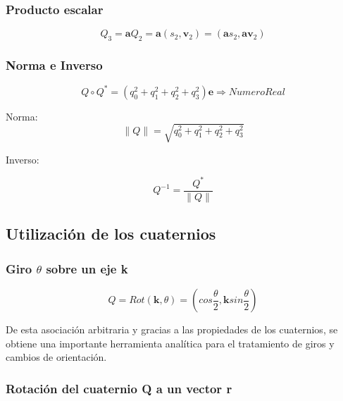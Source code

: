 \documentclass[letterpaper, openright, 12pt, spanish]{report}
\begin{document}
\subsubsection{Producto escalar}

\begin{displaymath}
Q_3=\textbf{a}Q_2=\textbf{a}(s_2, \textbf{v}_2)=(\textbf{a}s_2, \textbf{a}\textbf{v}_2)
\end{displaymath}

\subsubsection{Norma e Inverso}

\begin{displaymath}
Q\circ Q^*=(q^2_0+q^2_1+q^2_2+q^2_3)\textbf{e} \Longrightarrow Numero Real
\end{displaymath}

Norma:\\

\begin{displaymath}
\parallel{Q}\parallel=\sqrt{q^2_0+q^2_1+q^2_2+q^2_3}
\end{displaymath}

Inverso:

\begin{displaymath}
Q^{-1}=\frac{Q^*}{\parallel{Q}\parallel}
\end{displaymath}

\newpage

\subsection{Utilizaci\'on de los cuaternios}

\subsubsection{Giro $
\theta
$ sobre un eje k}

\begin{displaymath}
Q=Rot(\textbf{k},\theta)=(cos\frac{\theta}{2}, \textbf{k}sin\frac{\theta}{2})
\end{displaymath}

De esta asociaci\'on arbitraria y gracias a las propiedades de los cuaternios, se obtiene una importante herramienta anal\'itica para el tratamiento de giros y cambios de orientaci\'on.

\subsubsection{Rotaci\'on del cuaternio \textbf{Q} a un vector \textbf{r}}
\end{document}
